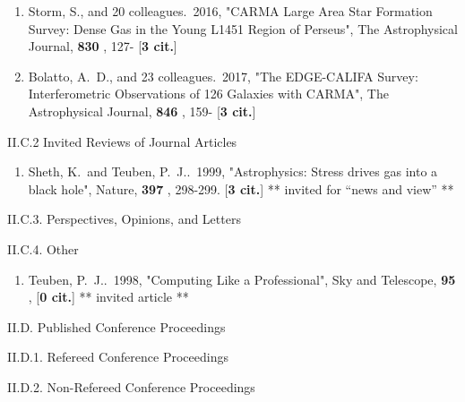 \documentclass[11pt,letterpaper]{article}
\begin{document}
\begin{enumerate}[resume,label=\textbf{\arabic*}.]
\item  
Storm, S., and 20 colleagues.\  2016,  "CARMA Large Area Star Formation 
Survey: Dense Gas in the Young L1451 Region of Perseus", The Astrophysical 
Journal,  {\bf 830} , 127- [{\bf 3 cit.}] 

\item  
Bolatto, A.~D., and 23 colleagues.\  2017,  "The EDGE-CALIFA Survey: 
Interferometric Observations of 126 Galaxies with CARMA", The Astrophysical 
Journal,  {\bf 846} , 159- [{\bf 3 cit.}] 


\end{enumerate}


II.C.2  Invited Reviews of Journal Articles


\begin{enumerate}[resume,label=\textbf{\arabic*}.]

\item  
Sheth, K.~and Teuben, P.~J..\  1999,  "Astrophysics:  Stress drives gas 
into a black hole", Nature,  {\bf 397} , 298-299.  [{\bf 3 cit.}] 
** invited for ``news and view'' **

\end{enumerate}

II.C.3. Perspectives, Opinions, and Letters

II.C.4. Other


\begin{enumerate}[resume,label=\textbf{\arabic*}.]
  
\item  
Teuben, P.~J..\  1998,  "Computing Like a Professional", Sky and Telescope,  
{\bf 95} ,  [{\bf 0 cit.}] 
** invited article **
  
\end{enumerate}
                

II.D. Published Conference Proceedings

II.D.1. Refereed Conference Proceedings

II.D.2. Non-Refereed Conference Proceedings

\end{document}
